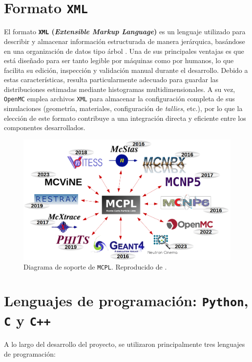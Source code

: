 \section{Formato \texttt{XML}}

El formato \textbf{\texttt{XML} (\textit{Extensible Markup Language})} es un lenguaje utilizado para describir y almacenar información estructurada de manera jerárquica, basándose en una organización de datos tipo árbol \cite{XML2025}. Una de sus principales ventajas es que está diseñado para ser tanto legible por máquinas como por humanos, lo que facilita su edición, inspección y validación manual durante el desarrollo. Debido a estas características, resulta particularmente adecuado para guardar las distribuciones estimadas mediante histogramas multidimensionales. A su vez, \texttt{OpenMC} emplea archivos \texttt{XML} para almacenar la configuración completa de sus simulaciones (geometría, materiales, configuración de \textit{tallies}, etc.), por lo que la elección de este formato contribuye a una integración directa y eficiente entre los componentes desarrollados.

\begin{figure}[H]
    \centering
    \includegraphics[width=\textwidth]{figs/mcpl_support_diagram.png}
    \caption[Diagrama de soporte de \texttt{MCPL}.]{Diagrama de soporte de \texttt{MCPL}. Reproducido de \cite{MCPL2024}.}
    \label{fig:mcpl_support_diagram}
\end{figure}

\section{Lenguajes de programación: \texttt{Python}, \texttt{C} y \texttt{C++}}

A lo largo del desarrollo del proyecto, se utilizaron principalmente tres lenguajes de programación:

